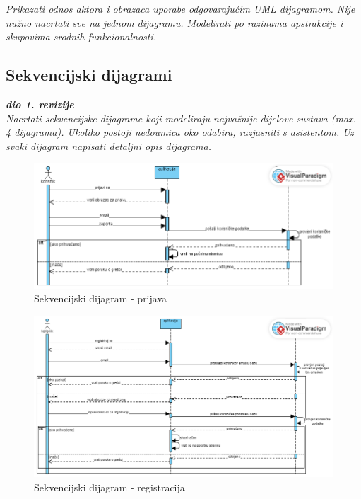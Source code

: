 					\textit{Prikazati odnos aktora i obrazaca uporabe odgovarajućim UML dijagramom. Nije nužno nacrtati sve na jednom dijagramu. Modelirati po razinama apstrakcije i skupovima srodnih funkcionalnosti.}
				\eject		
				
			\subsection{Sekvencijski dijagrami}
				
				\textbf{\textit{dio 1. revizije}}\\
				
				\textit{Nacrtati sekvencijske dijagrame koji modeliraju najvažnije dijelove sustava (max. 4 dijagrama). Ukoliko postoji nedoumica oko odabira, razjasniti s asistentom. Uz svaki dijagram napisati detaljni opis dijagrama.}
				
				\begin{figure}[H]
					\includegraphics[width=\textwidth]{slike/progiSeqLogin.png} %
					\caption{Sekvencijski dijagram - prijava}
					\label{fig:seq1} %
				\end{figure}
				
				\begin{figure}[H]
					\includegraphics[width=\textwidth]{slike/progiSeqRegister.png} %
					\caption{Sekvencijski dijagram - registracija}
					\label{fig:seq2} %
				\end{figure}
				\eject
	

